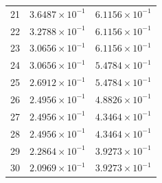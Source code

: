 \begin{table}[H]
\begin{tabular}{@{}rrr@{}}
21 & $3.6487\times10^{-1}$ & $6.1156\times10^{-1}$\\
22 & $3.2788\times10^{-1}$ & $6.1156\times10^{-1}$\\
23 & $3.0656\times10^{-1}$ & $6.1156\times10^{-1}$\\
24 & $3.0656\times10^{-1}$ & $5.4784\times10^{-1}$\\
25 & $2.6912\times10^{-1}$ & $5.4784\times10^{-1}$\\
26 & $2.4956\times10^{-1}$ & $4.8826\times10^{-1}$\\
27 & $2.4956\times10^{-1}$ & $4.3464\times10^{-1}$\\
28 & $2.4956\times10^{-1}$ & $4.3464\times10^{-1}$\\
29 & $2.2864\times10^{-1}$ & $3.9273\times10^{-1}$\\
30 & $2.0969\times10^{-1}$ & $3.9273\times10^{-1}$\\
\bottomrule
\end{tabular}
\end{table}

